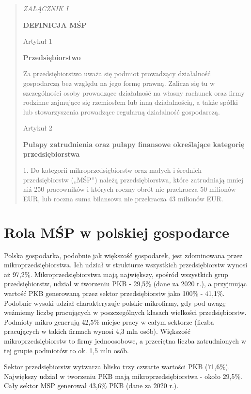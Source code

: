 \documentclass[11pt]{article}
\newenvironment{itquote}
  {\begin{quote} \begin{center}\itshape}
  {\end{center}  \end{quote}   \ignorespacesafterend}
\begin{document}
\begin{itquote}
    ZAŁĄCZNIK I

    \textbf{DEFINICJA MŚP}

    Artykuł 1

    \textbf{Przedsiębiorstwo}

    Za przedsiębiorstwo uważa się podmiot prowadzący działalność gospodarczą bez względu na jego formę prawną.
    Zalicza się tu w szczególności osoby prowadzące działalność na własny rachunek oraz firmy rodzinne zajmujące się rzemiosłem lub inną działalnością,
    a także spółki lub stowarzyszenia prowadzące regularną działalność gospodarczą.
    
    Artykuł 2

    \textbf{Pułapy zatrudnienia oraz pułapy finansowe określające kategorię przedsiębiorstwa}

    1. Do kategorii mikroprzedsiębiorstw oraz małych i średnich przedsiębiorstw („MŚP”) należą przedsiębiorstwa,
    które zatrudniają mniej niż 250 pracowników i których roczny obrót nie przekracza 50 milionów EUR, lub roczna
    suma bilansowa nie przekracza 43 milionów EUR.
\end{itquote}

\section*{Rola MŚP w polskiej gospodarce}

Polska gospodarka, podobnie jak większość gospodarek, jest zdominowana przez mikroprzedsiębiorstwa. 
Ich udział w strukturze wszystkich przedsiębiorstw wynosi aż 97,2\%. Mikroprzedsiębiorstwa mają największy, spośród wszystkich
grup przedsiębiorstw, udział w tworzeniu PKB - 29,5\% (dane za 2020 r.), a przyjmując wartość PKB generowaną
przez sektor przedsiębiorstw jako 100\% - 41,1\%. Podobnie wysoki udział charakteryzuje polskie mikrofirmy, gdy pod uwagę weźmiemy liczbę
pracujących w poszczególnych klasach wielkości przedsiębiorstw. Podmioty mikro generują 42,5\% miejsc 
pracy w całym sektorze (liczba pracujących w takich firmach wynosi 4,3 mln osób). Większość mikroprzedsiębiorstw to firmy jednoosobowe, a przeciętna liczba
zatrudnionych w tej grupie podmiotów to ok. 1,5 mln osób.

Sektor przedsiębiorstw wytwarza blisko trzy czwarte wartości PKB (71,6\%). Największy udział w tworzeniu
PKB mają mikroprzedsiębiorstwa - około 29,5\%. Cały sektor MSP generował 43,6\% PKB (dane za 2020 r.)\cite{RaportPARPoMSP}.
\end{document}
